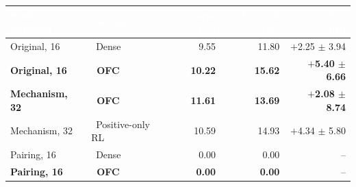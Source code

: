 \begin{tabular}{llrrr}
\toprule
\rowcolor{headcolor}\textcolor{white}{Study, iteration} & \textcolor{white}{Method} & \textcolor{white}{Sparse (\%)} & \textcolor{white}{Method (\%)} & \textcolor{white}{$\Delta$ $\pm$ 95\% (pp)} \\
\midrule
Original, 16 & \raisebox{0.3ex}{\textcolor{densecolor}{\rule{5pt}{5pt}}}~Dense & 9.55 & 11.80 & \cellcolor{ofccolor!14}\textcolor{ofccolor}{$+$2.25 $\pm$ 3.94} \\
\rowcolor{ofccolor!20}\textbf{Original, 16} & \textbf{\raisebox{0.3ex}{\textcolor{ofccolor}{\rule{5pt}{5pt}}}~\textcolor{ofccolor}{OFC}} & \textbf{10.22} & \textbf{15.62} & \textbf{\textcolor{ofccolor}{$+$5.40 $\pm$ 6.66}} \\
\rowcolor{ofccolor!20}\textbf{Mechanism, 32} & \textbf{\raisebox{0.3ex}{\textcolor{ofccolor}{\rule{5pt}{5pt}}}~\textcolor{ofccolor}{OFC}} & \textbf{11.61} & \textbf{13.69} & \textbf{\textcolor{ofccolor}{$+$2.08 $\pm$ 8.74}} \\
Mechanism, 32 & \raisebox{0.3ex}{\textcolor{poscolor}{\rule{5pt}{5pt}}}~Positive-only RL & 10.59 & 14.93 & \cellcolor{ofccolor!14}\textcolor{ofccolor}{$+$4.34 $\pm$ 5.80} \\
Pairing, 16 & \raisebox{0.3ex}{\textcolor{densecolor}{\rule{5pt}{5pt}}}~Dense & 0.00 & 0.00 & -- \\
\rowcolor{ofccolor!20}\textbf{Pairing, 16} & \textbf{\raisebox{0.3ex}{\textcolor{ofccolor}{\rule{5pt}{5pt}}}~\textcolor{ofccolor}{OFC}} & \textbf{0.00} & \textbf{0.00} & -- \\
\bottomrule
\end{tabular}
